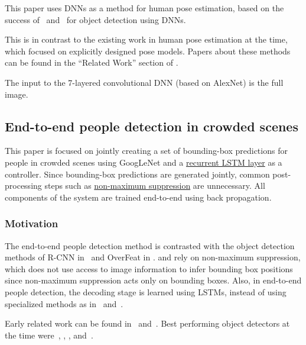 \documentclass[a4paper, 12pt]{article}
\begin{document}
This paper uses DNNs as a method for human pose estimation, based on the
success of~\citet{NIPS2013_5207} and~\citet{DBLP:journals/corr/GirshickDDM13} for
object detection using DNNs.

This is in contrast to the existing work in human pose estimation at the time,
which focused on explicitly designed pose models. Papers about these methods
can be found in the ``Related Work'' section of
\citet{DBLP:journals/corr/ToshevS13}.

The input to the 7-layered convolutional DNN (based on
AlexNet\citet{NIPS2012_4824}) is the full image.


\subsection{End-to-end people detection in crowded
            scenes\citet{DBLP:journals/corr/StewartA15}}

This paper is focused on jointly creating a set of bounding-box predictions for
people in crowded scenes using GoogLeNet and a
\hyperref[LSTM]{recurrent LSTM layer} as a controller. Since bounding-box
predictions are generated jointly, common post-processing steps such as
\hyperref[nonmax_supression]{non-maximum suppression} are unnecessary.  All
components of the system are trained end-to-end using back propagation.

\subsubsection{Motivation}

The end-to-end people detection method is contrasted with the object detection
methods of R-CNN in~\citet{DBLP:journals/corr/GirshickDDM13} and OverFeat in
\citet{DBLP:journals/corr/SermanetEZMFL13}.
\citet{DBLP:journals/corr/GirshickDDM13} and
\citet{DBLP:journals/corr/SermanetEZMFL13} rely on non-maximum suppression,
which does not use access to image information to infer bounding box positions
since non-maximum suppression acts only on bounding boxes. Also, in end-to-end
people detection, the decoding stage is learned using LSTMs, instead of using
specialized methods as in~\citet{VisualPhrases} and~\citet{TaAnSc_14:occluded}.

Early related work can be found in~\citet{Felzenszwalb:2010:ODD:1850486.1850574}
and~\citet{Leibe:2005:PDC:1068507.1069006}. Best performing object detectors at
the time were~\citet{DBLP:journals/corr/GirshickDDM13},
\citet{DBLP:journals/corr/SermanetEZMFL13}, \citet{Uijlings13},
\citet{DBLP:journals/corr/ZhangBS15} and~\citet{DBLP:journals/corr/SzegedyREA14}.
\end{document}
